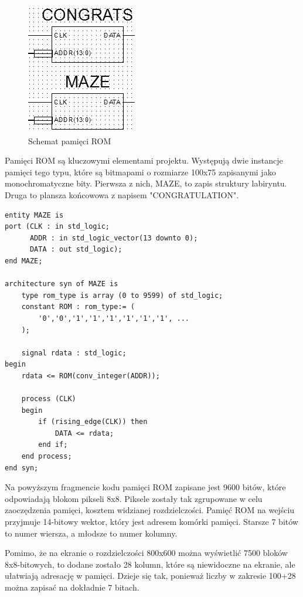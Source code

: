 \documentclass[11pt]{article}
\begin{document}
\begin{figure}[H]
\center
\includegraphics[scale=1]{ROM.png} 
\caption{Schemat pamięci ROM}
\end{figure}

Pamięci ROM są kluczowymi elementami projektu. Występują dwie instancje pamięci tego typu, które są bitmapami o rozmiarze 100x75 zapisanymi jako monochromatyczne bity.
Pierwsza z nich, MAZE, to zapis struktury labiryntu.
Druga to plansza końcowowa z napisem "CONGRATULATION".

\begin{lstlisting}[caption=Kod pamięci ROM]
entity MAZE is
port (CLK : in std_logic;
      ADDR : in std_logic_vector(13 downto 0);
      DATA : out std_logic);
end MAZE;

architecture syn of MAZE is
    type rom_type is array (0 to 9599) of std_logic;
    constant ROM : rom_type:= (
        '0','0','1','1','1','1','1','1', ...
    );

    signal rdata : std_logic;
begin
    rdata <= ROM(conv_integer(ADDR));

    process (CLK)
    begin
        if (rising_edge(CLK)) then
            DATA <= rdata;
        end if;
    end process;
end syn;
\end{lstlisting}

Na powyższym fragmencie kodu pamięci ROM zapisane jest 9600 bitów, które odpowiadają blokom pikseli 8x8.
Piksele zostały tak zgrupowane w celu zaoczędzenia pamięci, kosztem widzianej rozdzielczości.
Pamięć ROM na wejściu przyjmuje 14-bitowy wektor, który jest adresem komórki pamięci.
Starsze 7 bitów to numer wiersza, a młodsze to numer kolumny.

Pomimo, że na ekranie o rozdzielczości 800x600 można wyświetlić 7500 bloków 8x8-bitowych, to dodane zostało 28 kolumn, które są niewidoczne na ekranie, ale ułatwiają adresację w pamięci.
Dzieje się tak, ponieważ liczby w zakresie 100+28 można zapisać na dokładnie 7 bitach.
\end{document}
